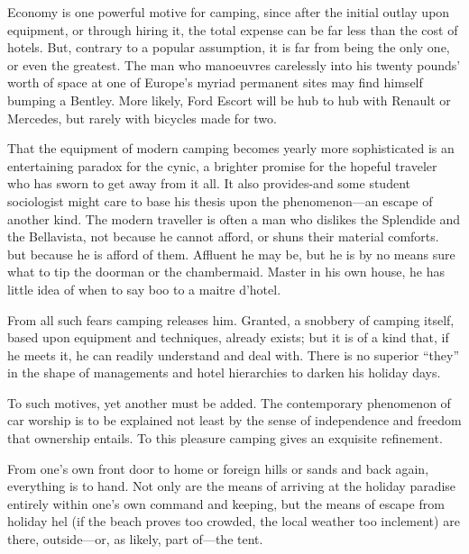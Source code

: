 \documentclass[11pt]{article}
\begin{document}
Economy is one powerful motive for camping, since after the initial outlay upon equipment, or through hiring it, the total expense can be far less than the cost of hotels. But, contrary to a popular assumption, it is far from being the only one, or even the greatest. The man who manoeuvres carelessly into his twenty pounds' worth of space at one of Europe's myriad permanent sites may find himself bumping a Bentley. More likely, Ford Escort will be hub to hub with Renault or Mercedes, but rarely with bicycles made for two.

That the equipment of modern camping becomes yearly more sophisticated is an entertaining paradox for the cynic, a brighter promise for the hopeful traveler who has sworn to get away from it all. It also provides-and some student sociologist might care to base his thesis upon the phenomenon---an escape of another kind. The modern traveller is often a man who dislikes the Splendide and the Bellavista, not because he cannot afford, or shuns their material comforts. but because he is afford of them. Affluent he may be, but he is by no means sure what to tip the doorman or the chambermaid. Master in his own house, he has little idea of when to say boo to a maitre d'hotel.

From all such fears camping releases him. Granted, a snobbery of camping itself, based upon equipment and techniques, already exists; but it is of a kind that, if he meets it, he can readily understand and deal with. There is no superior ``they'' in the shape of managements and hotel hierarchies to darken his holiday days.

To such motives, yet another must be added. The contemporary phenomenon of car worship is to be explained not least by the sense of independence and freedom that ownership entails. To this pleasure camping gives an exquisite refinement.

From one's own front door to home or foreign hills or sands and back again, everything is to hand. Not only are the means of arriving at the holiday paradise entirely within one's own command and keeping, but the means of escape from holiday hel (if the beach proves too crowded, the local weather too inclement) are there, outside---or, as likely, part of---the tent.
\end{document}
